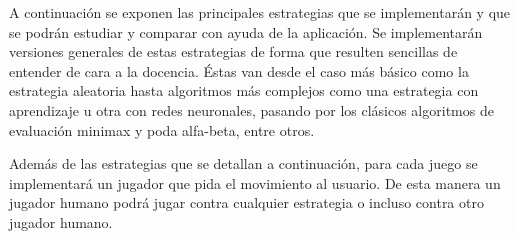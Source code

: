 \documentclass[a4paper,12pt]{article}
\begin{document}
\par 
A continuación se exponen las principales estrategias que se implementarán y que se podrán estudiar y comparar con ayuda de la aplicación.
Se implementarán versiones generales de estas estrategias de forma que resulten sencillas de entender de cara a la docencia.
Éstas van desde el caso más básico como la estrategia aleatoria hasta algoritmos más complejos como una estrategia con aprendizaje u otra con redes neuronales, pasando por los clásicos algoritmos de evaluación minimax y poda alfa-beta, entre otros.

\par 
Además de las estrategias que se detallan a continuación, para cada juego se implementará un jugador que pida el movimiento al usuario.
De esta manera un jugador humano podrá jugar contra cualquier estrategia o incluso contra otro jugador humano.
\clearpage
\end{document}
